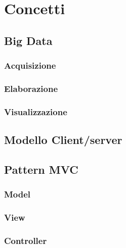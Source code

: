 \chapter{Concetti}%
	\section{Big Data}\label{sec:bigdata}
		\subsection{Acquisizione}
		\subsection{Elaborazione}
		\subsection{Visualizzazione}
	\section{Modello Client/server}%
	\section{Pattern MVC}
		\subsection{Model}
		\subsection{View}
		\subsection{Controller}
	
	